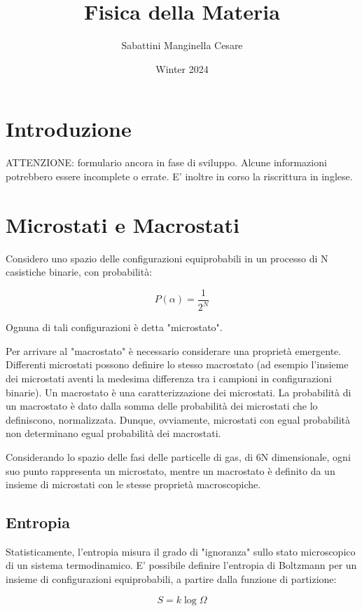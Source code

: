 \documentclass{article}
\title{Fisica della Materia}
\author{Sabattini Manginella Cesare}
\date{Winter 2024}
\begin{document}
\maketitle

\tableofcontents

\section{Introduzione}
ATTENZIONE: formulario ancora in fase di sviluppo. Alcune informazioni potrebbero essere incomplete o errate.
E' inoltre in corso la riscrittura in inglese.

\section{Microstati e Macrostati}
Considero uno spazio delle configurazioni equiprobabili in un processo di N casistiche binarie, con probabilità:

\begin{equation}
    P(\alpha) = \frac{1}{2^N}
\end{equation}

Ognuna di tali configurazioni è detta "microstato".

Per arrivare al "macrostato" è necessario considerare una proprietà emergente.
Differenti microstati possono definire lo stesso macrostato (ad esempio l'insieme dei microstati aventi la medesima differenza tra i campioni in configurazioni binarie).
Un macrostato è una caratterizzazione dei microstati.
La probabilità di un macrostato è dato dalla somma delle probabilità dei microstati che lo definiscono, normalizzata.
Dunque, ovviamente, microstati con egual probabilità non determinano egual probabilità dei macrostati.

Considerando lo spazio delle fasi delle particelle di gas, di 6N dimensionale, ogni suo punto rappresenta un microstato, mentre un macrostato è definito da un insieme di microstati con le stesse proprietà macroscopiche.


\subsection{Entropia}
Statisticamente, l'entropia misura il grado di "ignoranza" sullo stato microscopico di un sistema termodinamico.
E' possibile definire l'entropia di Boltzmann per un insieme di configurazioni equiprobabili, a partire dalla funzione di partizione:

\begin{equation}
    S = k \log \Omega
\end{equation}
\end{document}
